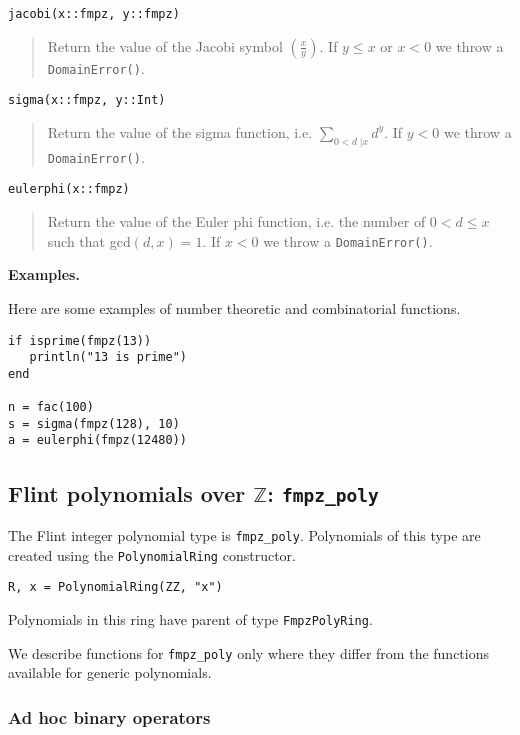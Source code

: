 \documentclass[a4paper,10pt]{article}
\newcommand{\Z}{\mathbb{Z}}
\newcommand{\code}{\lstinline}
\newcommand{\desc}[1]{\vspace{-3mm}\begin{quote}#1\end{quote}}
\newcommand{\ljk}[2]{\left(\frac{#1}{#2}\right)}
\begin{document}
{{\begin{lstlisting}
jacobi(x::fmpz, y::fmpz)
\end{lstlisting}

\desc{Return the value of the Jacobi symbol $\ljk{x}{y}$. If $y \leq x$ or $x < 0$ we
throw a \code{DomainError()}.}

\begin{lstlisting}
sigma(x::fmpz, y::Int)
\end{lstlisting}

\desc{Return the value of the sigma function, i.e. $\sum_{0 < d \;| x} d^y$. If $y < 0$
we throw a \code{DomainError()}.}

\begin{lstlisting}
eulerphi(x::fmpz)
\end{lstlisting}

\desc{Return the value of the Euler phi function, i.e. the number of $0 < d \leq x$ such
that gcd$(d, x) = 1$. If $x < 0$ we throw a \code{DomainError()}.}

\textbf{Examples.}

Here are some examples of number theoretic and combinatorial functions.

\begin{lstlisting}
if isprime(fmpz(13))
   println("13 is prime")
end

n = fac(100)
s = sigma(fmpz(128), 10)
a = eulerphi(fmpz(12480))
\end{lstlisting}

\subsection{Flint polynomials over $\Z$: \code{fmpz_poly}}

The Flint integer polynomial type is \code{fmpz_poly}. Polynomials of this type are created
using the \code{PolynomialRing} constructor.

\begin{lstlisting}
R, x = PolynomialRing(ZZ, "x")
\end{lstlisting}

Polynomials in this ring have parent of type \code{FmpzPolyRing}.

We describe functions for \code{fmpz_poly} only where they differ from the functions
available for generic polynomials.

\subsubsection{Ad hoc binary operators}

}}
\end{document}
